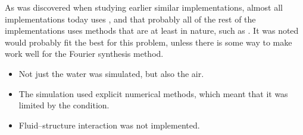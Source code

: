 As was discovered when studying earlier similar implementations, almost all implementations today uses , and that probably all of the rest of the implementations uses methods that are at least  in nature, such as \LPD. It was noted \LPD would probably fit the best for this problem, unless there is some way to make \FSI work well for the Fourier synthesis method.

\HRule

\begin{itemize}
    \item Not just the water was simulated, but also the air. %
    
    \item The simulation used explicit numerical methods, which meant that it was limited by the \CFL condition. %
    
    \item Fluid--structure interaction was not implemented. %
\end{itemize}